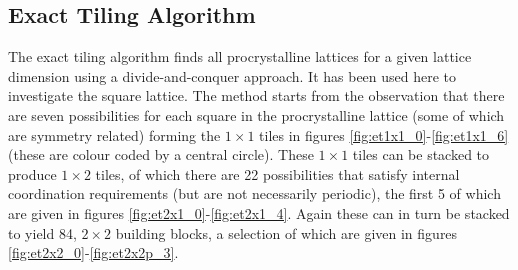 \subsection{Exact Tiling Algorithm}

The exact tiling algorithm finds all procrystalline lattices for a given lattice dimension using a divide\--and\--conquer approach.
It has been used here to investigate the square lattice.
The method starts from the observation that there are seven possibilities for each square in the procrystalline lattice (some of which are symmetry related) forming the $1\times 1$ tiles in figures \ref{fig:et1x1_0}\--\ref{fig:et1x1_6} (these are colour coded by a central circle).
These $1\times 1$ tiles can be stacked to produce $1\times 2$ tiles, of which there are 22 possibilities that satisfy internal coordination requirements (but are not necessarily periodic), the first 5 of which are given in figures \ref{fig:et2x1_0}\--\ref{fig:et2x1_4}.
Again these can in turn be stacked to yield 84, $2\times 2$ building blocks, a selection of which are given in figures \ref{fig:et2x2_0}\--\ref{fig:et2x2p_3}.

